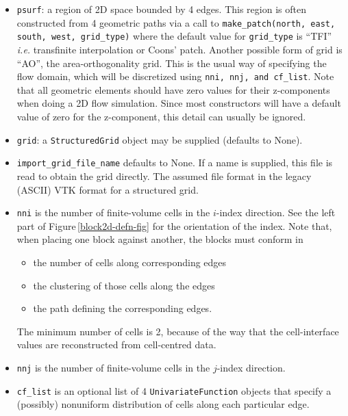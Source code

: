 \documentclass[12pt,a4paper,twoside]{article}
\begin{document}
\begin{itemize}
\item \texttt{psurf}: a region of 2D space bounded by 4 edges.
    This region is often constructed from 4 geometric paths via a call to
    \texttt{make\_patch(north, east, south, west, grid\_type)} where the
    default value for \texttt{grid\_type} is ``TFI'' \textit{i.e.} transfinite interpolation
    or Coons' patch.
    Another possible form of grid is ``AO'', the area-orthogonality grid.
    This is the usual way of specifying the flow domain, which will be discretized 
    using \texttt{nni, nnj, and cf\_list}.
    Note that all geometric elements should have zero values for their z-components when
    doing a 2D flow simulation.
    Since most constructors will have a default value of zero for the z-component, this
    detail can usually be ignored.
\item \texttt{grid}: a \texttt{StructuredGrid} object may be supplied (defaults to None). 
\item \texttt{import\_grid\_file\_name} defaults to None.
  If a name is supplied, this file is read to obtain the grid directly.
  The assumed file format in the legacy (ASCII) VTK format for a structured grid.
\item \texttt{nni} is the number of finite-volume cells in the $i$-index
  direction. See the left part of Figure\,\ref{block2d-defn-fig} for the orientation of the index.
  Note that, when placing one block against another, the blocks must conform in
  \begin{itemize}
    \item the number of cells along corresponding edges
    \item the clustering of those cells along the edges
    \item the path defining the corresponding edges.
  \end{itemize}
  The minimum number of cells is 2, because of the way that the cell-interface values are 
  reconstructed from cell-centred data.
\item \texttt{nnj} is the number of finite-volume cells in the $j$-index direction.
\item \texttt{cf\_list} \label{cflist-item} is an optional list of 4 \texttt{UnivariateFunction} objects
  that specify a (possibly) nonuniform distribution of cells along each particular edge.

\end{itemize}
\end{document}
